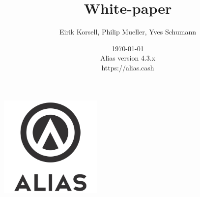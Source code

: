 \documentclass[a4paper,12pt]{article}
\title{White-paper}
\author{Eirik Korsell, Philip Mueller, Yves Schumann}
\date{\today \\
	Alias version 4.3.x\\
	https://alias.cash}
\begin{document}
\begin{titlingpage} %
\begin{center}
\includegraphics[height=5cm]{Images/Alias-Stacked-Black.png}\\ %
\vspace{4cm} %
\begin{huge} 
\textbf{\thetitle} \\
\end{huge}
\vspace{1cm}
\theauthor\\
\vspace{7cm} %
\thedate
\end{center}
\end{titlingpage}

\sffamily

\begin{spacing}{1}
    \tableofcontents
\end{spacing}

\setlength{\arrayrulewidth}{.5mm}
\setlength{\tabcolsep}{8pt}
\renewcommand{\arraystretch}{1.5}














\end{document}
